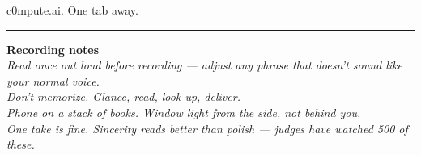 \documentclass[12pt]{article}
\newcommand{\stage}[1]{{\itshape\color{stagecolor}#1}}
\begin{document}
\vspace{0.4em}

c0mpute.ai. One tab away.

\vspace{1.5em}\hrule\vspace{1em}

{\small
\textbf{Recording notes}\\[0.3em]
\stage{Read once out loud before recording --- adjust any phrase that doesn't sound like your normal voice.}\\[0.2em]
\stage{Don't memorize. Glance, read, look up, deliver.}\\[0.2em]
\stage{Phone on a stack of books. Window light from the side, not behind you.}\\[0.2em]
\stage{One take is fine. Sincerity reads better than polish --- judges have watched 500 of these.}
}
\end{document}
